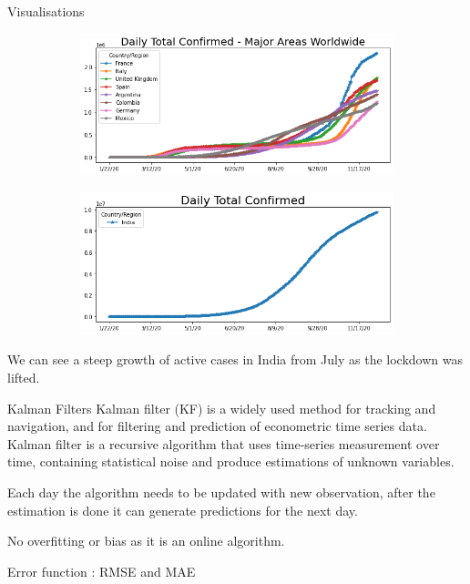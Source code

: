 \documentclass[11pt]{beamer}
\begin{document}
\begin{frame}{Visualisations}
\begin{figure}[!h]
\begin{subfigure}{.5\textwidth}
\centering
\includegraphics[width=1\linewidth]{conf.png}
\end{subfigure}%
\begin{subfigure}{.5\textwidth}
\centering
\includegraphics[width=1\linewidth]{india_conf.png}
\end{subfigure}
\end{figure}
We can see a steep growth of active cases in India from July as the lockdown was lifted.
\end{frame}

\begin{frame}{Kalman Filters}
Kalman filter (KF) is a widely used method for tracking and navigation, and for filtering and prediction of econometric time series data. Kalman filter is a recursive algorithm that uses time-series measurement over time, containing statistical noise and produce estimations of unknown variables.

\medskip

Each day the algorithm needs to be updated with new observation, after the estimation is done it can generate predictions for the next day.

\medskip

No overfitting or bias as it is an online algorithm.

\medskip

Error function : RMSE and MAE
\end{frame}
\end{document}

